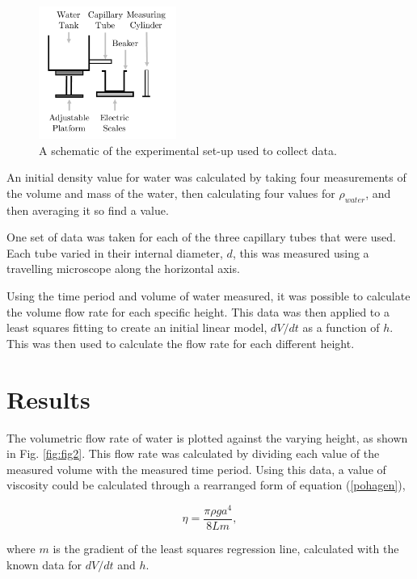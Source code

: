 \documentclass[twocolumn]{revtex4}
\begin{document}
\begin{figure}[!h]
\begin{center}
\includegraphics[width=4.5cm]{fig1}
\caption[]{A schematic of the experimental set-up used to collect data. }
\label{fig:fig1}
\end{center}
\end{figure}

An initial density value for water was calculated by taking four measurements of the volume and mass of the water, then calculating four values for $\rho_{water}$, and then averaging it so find a value. 

One set of data was taken for each of the three capillary tubes that were used. Each tube varied in their internal diameter, $d$, this was measured using a travelling microscope along the horizontal axis. 

Using the time period and volume of water measured, it was possible to calculate the volume flow rate for each specific height. This data was then applied to a least squares fitting to create an initial linear model, $dV/dt$ as a function of $h$. This was then used to calculate the flow rate for each different height. 

\vspace{-3ex}
\section{Results}
\vspace{-2ex}

The volumetric flow rate of water is plotted against the varying height, as shown in Fig. \ref{fig:fig2}. This flow rate was calculated by dividing each value of the measured volume with the measured time period. Using this data, a value of viscosity could be calculated through a rearranged form of equation (\ref{pohagen}),

\begin{equation} 
\eta=\frac{\pi \rho g a^4 }{8 L m}, 
\label{r-pohagen}
\end{equation}

where $m$ is the gradient of the least squares regression line, calculated with the known data for $dV/dt$ and $h$.
\end{document}

